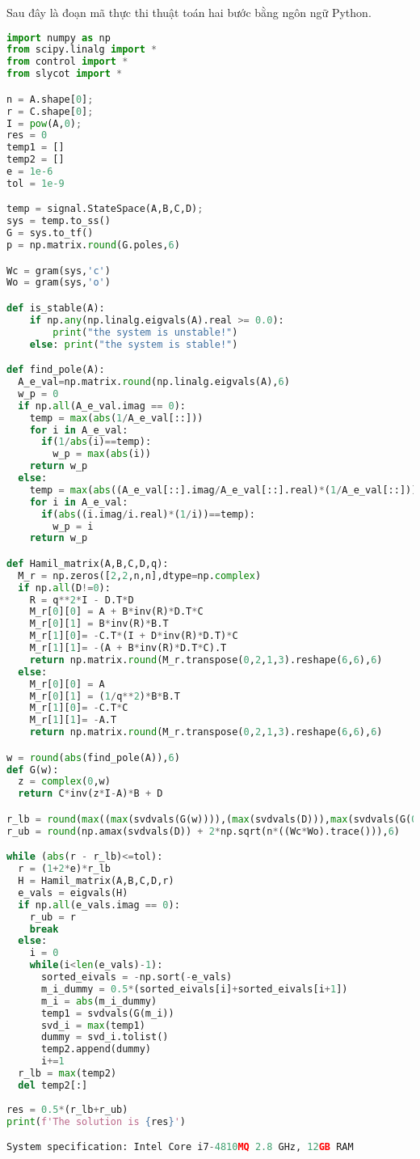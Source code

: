 \newpage
Sau đây là đoạn mã thực thi thuật toán hai bước bằng ngôn ngữ Python.
\begin{lstlisting}[language=Python, caption=Thuật toán hai bước]
import numpy as np
from scipy.linalg import *
from control import *
from slycot import *

n = A.shape[0];
r = C.shape[0];
I = pow(A,0);
res = 0
temp1 = []
temp2 = []
e = 1e-6
tol = 1e-9

temp = signal.StateSpace(A,B,C,D);
sys = temp.to_ss()
G = sys.to_tf()
p = np.matrix.round(G.poles,6)

Wc = gram(sys,'c')
Wo = gram(sys,'o')

def is_stable(A):
    if np.any(np.linalg.eigvals(A).real >= 0.0):
        print("the system is unstable!")
    else: print("the system is stable!")

def find_pole(A):
  A_e_val=np.matrix.round(np.linalg.eigvals(A),6)
  w_p = 0
  if np.all(A_e_val.imag == 0):
    temp = max(abs(1/A_e_val[::]))
    for i in A_e_val:
      if(1/abs(i)==temp):
        w_p = max(abs(i))
    return w_p
  else:
    temp = max(abs((A_e_val[::].imag/A_e_val[::].real)*(1/A_e_val[::])))
    for i in A_e_val:
      if(abs((i.imag/i.real)*(1/i))==temp):
        w_p = i
    return w_p

def Hamil_matrix(A,B,C,D,q):
  M_r = np.zeros([2,2,n,n],dtype=np.complex)
  if np.all(D!=0):
    R = q**2*I - D.T*D
    M_r[0][0] = A + B*inv(R)*D.T*C
    M_r[0][1] = B*inv(R)*B.T
    M_r[1][0]= -C.T*(I + D*inv(R)*D.T)*C
    M_r[1][1]= -(A + B*inv(R)*D.T*C).T
    return np.matrix.round(M_r.transpose(0,2,1,3).reshape(6,6),6)
  else:
    M_r[0][0] = A
    M_r[0][1] = (1/q**2)*B*B.T
    M_r[1][0]= -C.T*C
    M_r[1][1]= -A.T
    return np.matrix.round(M_r.transpose(0,2,1,3).reshape(6,6),6)

w = round(abs(find_pole(A)),6)
def G(w):
  z = complex(0,w)
  return C*inv(z*I-A)*B + D

r_lb = round(max((max(svdvals(G(w)))),(max(svdvals(D))),max(svdvals(G(0)))),6)
r_ub = round(np.amax(svdvals(D)) + 2*np.sqrt(n*((Wc*Wo).trace())),6)

while (abs(r - r_lb)<=tol):
  r = (1+2*e)*r_lb
  H = Hamil_matrix(A,B,C,D,r)
  e_vals = eigvals(H)
  if np.all(e_vals.imag == 0):
    r_ub = r
    break
  else:
    i = 0
    while(i<len(e_vals)-1):
      sorted_eivals = -np.sort(-e_vals)
      m_i_dummy = 0.5*(sorted_eivals[i]+sorted_eivals[i+1])
      m_i = abs(m_i_dummy)
      temp1 = svdvals(G(m_i))
      svd_i = max(temp1)
      dummy = svd_i.tolist()
      temp2.append(dummy)
      i+=1
  r_lb = max(temp2)
  del temp2[:]
 
res = 0.5*(r_lb+r_ub) 
print(f'The solution is {res}')

System specification: Intel Core i7-4810MQ 2.8 GHz, 12GB RAM
\end{lstlisting}
